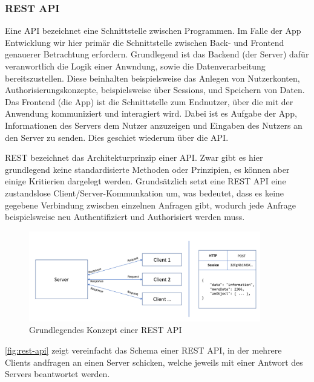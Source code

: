 \subsubsection*{\ac{REST} \ac{API}}
Eine \ac{API} bezeichnet eine Schnittstelle zwischen Programmen. 
Im Falle der App Entwicklung wir hier primär die Schnittstelle zwischen Back- und Frontend genauerer Betrachtung erfordern.
Grundlegend ist das Backend (der Server) dafür veranwortlich die Logik einer Anwndung, sowie die Datenverarbeitung bereitszustellen.
Diese beinhalten beispielsweise das Anlegen von Nutzerkonten, Authorisierungskonzepte, beispielsweise über Sessions, und Speichern von Daten.
Das Frontend (die App) ist die Schnittstelle zum Endnutzer, über die mit der Anwendung kommuniziert und interagiert wird.
Dabei ist es Aufgabe der App, Informationen des Servers dem Nutzer anzuzeigen und Eingaben des Nutzers an den Server zu senden. 
Dies geschiet wiederum über die \ac{API}.

\ac{REST} bezeichnet das Architekturprinzip einer API.
Zwar gibt es hier grundlegend keine standardisierte Methoden oder Prinzipien, es können aber einige Kritierien dargelegt werden.
Grundsätzlich setzt eine \ac{REST} \ac{API} eine zustandslose Client/Server-Kommunkation um, was bedeutet, dass es keine gegebene Verbindung zwischen einzelnen Anfragen gibt, wodurch jede Anfrage beispielsweise neu Authentifiziert und Authorisiert werden muss\autocite{B_RedHat.}.

\begin{figure}[h]
    \begin{center}
        \includegraphics[width=0.9\textwidth]{img/rest_api.PNG}
    \end{center}
    \caption{Grundlegendes Konzept einer REST API}
    \label{fig:rest-api}
\end{figure}

\autoref{fig:rest-api} zeigt vereinfacht das Schema einer \ac{REST} \ac{API}, in der mehrere Clients andfragen an einen Server schicken, welche jeweils mit einer Antwort des Servers beantwortet werden.

